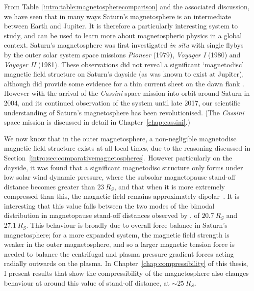{From Table~\ref{intro:table:magnetospherecomparison} and the associated discussion, we have seen that in many ways Saturn's magnetosphere is an intermediate between Earth and Jupiter. It is therefore a particularly interesting system to study, and can be used to learn more about magnetospheric physics in a global context. Saturn's magnetosphere was first investigated \textit{in situ} with single flybys by the outer solar system space missions \textit{Pioneer} (1979), \textit{Voyager I} (1980) and \textit{Voyager II} (1981). These observations did not reveal a significant `magnetodisc' magnetic field structure on Saturn's dayside (as was known to exist at Jupiter), although did provide some evidence for a thin current sheet on the dawn flank \citep{smith1980}. However with the arrival of the \textit{Cassini} space mission into orbit around Saturn in 2004, and its continued observation of the system until late 2017, our scientific understanding of Saturn's magnetosphere has been revolutionised. (The \textit{Cassini} space mission is discussed in detail in Chapter~\ref{chap:cassini}.)

We now know that in the outer magnetosphere, a non-negligible magnetodisc magnetic field structure exists at all local times, due to the reasoning discussed in Section~\ref{intro:sec:comparativemagnetospheres}. However particularly on the dayside, it was found that a significant magnetodisc structure only forms under low solar wind dynamic pressure, where the subsolar magnetopause stand-off distance becomes greater than $\SI{23}{R_S}$, and that when it is more extremely compressed than this, the magnetic field remains approximately dipolar~\citep{arridge2008}. It is interesting that this value falls between the two modes of the bimodal distribution in magnetopause stand-off distances observed by \citet{pilkington2015}, of $\SI{20.7}{R_S}$ and $\SI{27.1}{R_S}$. This behaviour is broadly due to overall force balance in Saturn's magnetosphere; for a more expanded system, the magnetic field strength is weaker in the outer magnetosphere, and so a larger magnetic tension force is needed to balance the centrifugal and plasma pressure gradient forces acting radially outwards on the plasma. In Chapter~\ref{chap:compressibility} of this thesis, I present results that show the compressibility of the magnetosphere also changes behaviour at around this value of stand-off distance, at ${\sim}\SI{25}{R_S}$. 

}
